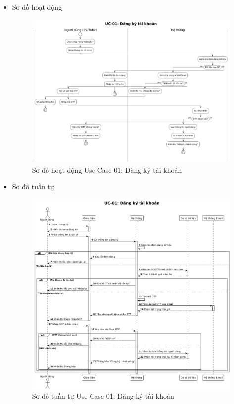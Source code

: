 \begin{itemize}
    \item Sơ đồ hoạt động
    \begin{figure}[H]
    \centering
    \includegraphics[scale=0.35 ]{Picture/ACUC01.png}
    \caption{Sơ đồ hoạt động Use Case 01: Đăng ký tài khoản}
    \end{figure}
    \item Sơ đồ tuần tự
    \begin{figure}[H]
    \centering
    \includegraphics[scale=0.35 ]{Picture/SEUC01.png}
    \caption{Sơ đồ tuần tự Use Case 01: Đăng ký tài khoản}
    \end{figure}
\end{itemize}
